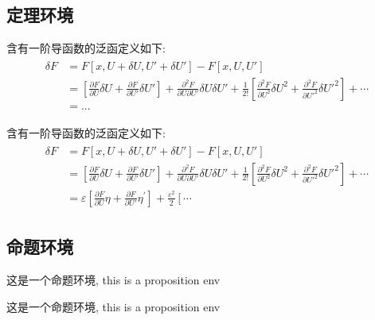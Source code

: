 \documentclass[lang=cn, math=mathptmx]{ZLaTeX}
\begin{document}
\subsection{定理环境}
\begin{bytes}[10]
\begin{theorem}
    含有一阶导函数的泛函定义如下:
    \begin{align}
        \begin{aligned}
            \delta F
            & = F[x,U+\delta U,U'+\delta U']-F[x,U,U']  \\
            & = \left[\frac{\partial F}{\partial U}\delta U+\frac{\partial F}{\partial U'}\delta U'\right]+\frac{\partial^2F}{\partial U\partial U'}\delta U\delta U'+\frac{1}{2!}\left[\frac{\partial^2F}{\partial U^2}\delta U^2+\frac{\partial^2F}{\partial U'^2}\delta U'^2\right]+\cdots \\
            & = ...
        \end{aligned}
    \end{align}
\end{theorem}
\end{bytes}
\begin{theorem}
含有一阶导函数的泛函定义如下:
\begin{align}
    \begin{aligned}
        \delta F
        & = F[x,U+\delta U,U'+\delta U']-F[x,U,U']  \\
        & = \left[\frac{\partial F}{\partial U}\delta U+\frac{\partial F}{\partial U'}\delta U'\right]+\frac{\partial^2F}{\partial U\partial U'}\delta U\delta U'+\frac{1}{2!}\left[\frac{\partial^2F}{\partial U^2}\delta U^2+\frac{\partial^2F}{\partial U'^2}\delta U'^2\right]+\cdots \\
        & =\varepsilon\left[\frac{\partial F}{\partial U}\eta+\frac{\partial F}{\partial U'}\eta^{\prime}\right]+\frac{\varepsilon^{2}}{2}\left[\cdots\right.
    \end{aligned}
\end{align}
\end{theorem}

\subsection{命题环境}
\begin{bytes}[10]
\begin{proposition}[某命题]
    这是一个命题环境, this is a proposition env
\end{proposition}
\end{bytes}
\begin{proposition}[某命题]
    这是一个命题环境, this is a proposition env
\end{proposition}
\end{document}
